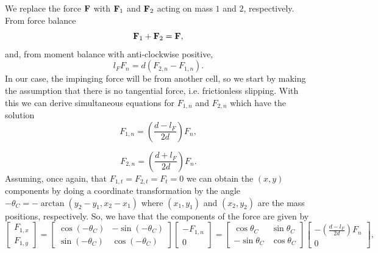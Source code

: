 We replace the force $\vb{F}$ with $\vb{F}_1$ and $\vb{F}_2$ acting on mass $1$ and $2$, respectively. From force balance
\begin{equation*}
 \vb{F}_1+  \vb{F}_2 = \vb{F}, 
\end{equation*}
and, from moment balance with anti-clockwise positive,
\begin{equation*}
 l_F F_n = d(F_{2,n} - F_{1,n}).
\end{equation*}
In our case, the impinging force will be from another cell, so we start by making the assumption that there is no tangential force, i.e. frictionless slipping. With this we can
derive simultaneous equations for $F_{1,n}$ and $F_{2,n}$ which have the solution
\begin{equation*}
    F_{1,n} =  \left( \frac{d-l_F}{2d} \right) F_n,
\end{equation*}

\begin{equation*}
    F_{2,n} =  \left( \frac{d+l_F}{2d} \right) F_n.
\end{equation*}
Assuming, once again, that $F_{1,t} = F_{2,t} = F_t = 0$ we can obtain the $(x,y)$ components by doing a coordinate transformation by the angle $-\theta_C = - \arctan{\left( y_2-y_1, x_2-x_1  \right)}$ where $(x_1,y_1)$ and $(x_2,y_2)$ are the mass positions, respectively. So, we have that the components of the force are given by 
\begin{equation*}
    \begin{bmatrix}
    F_{1,x} \\
    F_{1,y} 
    \end{bmatrix}
    =
    \begin{bmatrix}
    \cos{(-\theta_C)} & -\sin{(-\theta_C)}\\
    \sin{(-\theta_C)} & \cos{(-\theta_C)} 
    \end{bmatrix}
    \begin{bmatrix}
    -F_{1,n} \\
    0 
    \end{bmatrix}
    =
    \begin{bmatrix}
    \cos{\theta_C} & \sin{\theta_C}\\
    -\sin{\theta_C} & \cos{\theta_C} 
    \end{bmatrix}
    \begin{bmatrix}
    -\left( \frac{d-l_F}{2d} \right) F_n \\
    0 
    \end{bmatrix},   
\end{equation*}




